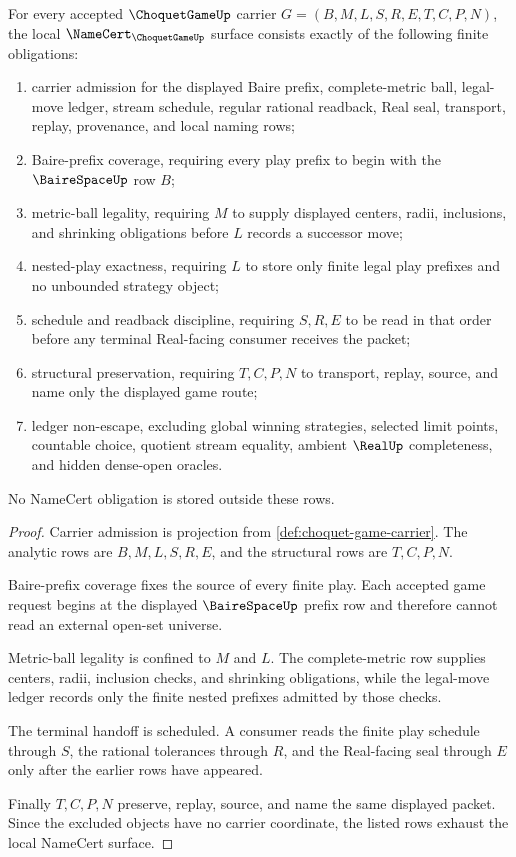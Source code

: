 \begin{theorem}
\label{thm:choquet-game-namecert-obligations}
For every accepted $\ChoquetGameUp$ carrier $G=(B,M,L,S,R,E,T,C,P,N)$, the local $\NameCert_{\ChoquetGameUp}$ surface consists exactly of the following finite obligations:
\begin{enumerate}
\item carrier admission for the displayed Baire prefix, complete-metric ball, legal-move ledger, stream schedule, regular rational readback, Real seal, transport, replay, provenance, and local naming rows;
\item Baire-prefix coverage, requiring every play prefix to begin with the $\BaireSpaceUp$ row $B$;
\item metric-ball legality, requiring $M$ to supply displayed centers, radii, inclusions, and shrinking obligations before $L$ records a successor move;
\item nested-play exactness, requiring $L$ to store only finite legal play prefixes and no unbounded strategy object;
\item schedule and readback discipline, requiring $S,R,E$ to be read in that order before any terminal Real-facing consumer receives the packet;
\item structural preservation, requiring $T,C,P,N$ to transport, replay, source, and name only the displayed game route;
\item ledger non-escape, excluding global winning strategies, selected limit points, countable choice, quotient stream equality, ambient $\RealUp$ completeness, and hidden dense-open oracles.
\end{enumerate}
No NameCert obligation is stored outside these rows.
\end{theorem}
\begin{proof}
Carrier admission is projection from \autoref{def:choquet-game-carrier}. The analytic rows are $B,M,L,S,R,E$, and the structural rows are $T,C,P,N$.

Baire-prefix coverage fixes the source of every finite play. Each accepted game request begins at the displayed $\BaireSpaceUp$ prefix row and therefore cannot read an external open-set universe.

Metric-ball legality is confined to $M$ and $L$. The complete-metric row supplies centers, radii, inclusion checks, and shrinking obligations, while the legal-move ledger records only the finite nested prefixes admitted by those checks.

The terminal handoff is scheduled. A consumer reads the finite play schedule through $S$, the rational tolerances through $R$, and the Real-facing seal through $E$ only after the earlier rows have appeared.

Finally $T,C,P,N$ preserve, replay, source, and name the same displayed packet. Since the excluded objects have no carrier coordinate, the listed rows exhaust the local NameCert surface.
\end{proof}

